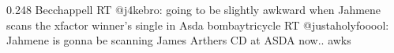 {0.248}
{\joinNameTweet
{Becchappell}
{RT @j4kebro: going to be slightly awkward when Jahmene scans the xfactor winner's single in Asda}}
{\joinNameTweet
{bombaytricycle}
{RT @justaholyfooool: Jahmene is gonna be scanning James Arthers CD at ASDA now.. awks}}
%
%
%
%
%
%
%
%
%
